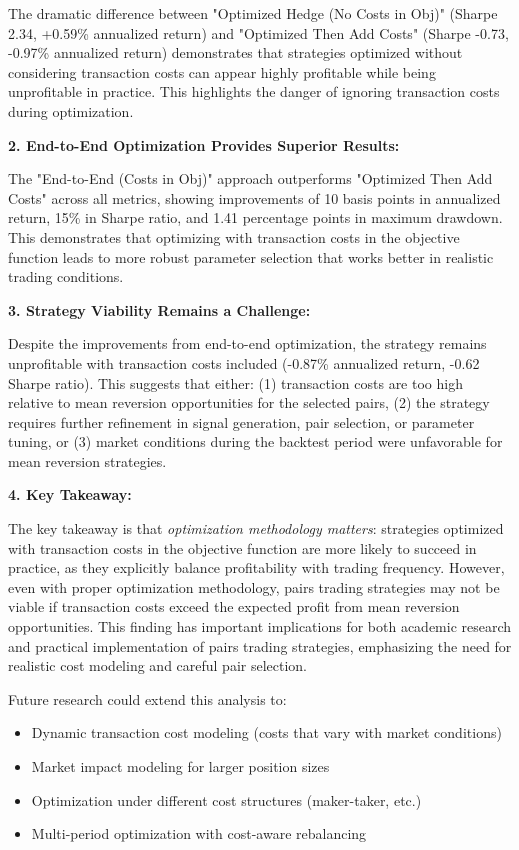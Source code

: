 The dramatic difference between "Optimized Hedge (No Costs in Obj)" (Sharpe 2.34, +0.59\% annualized return) and "Optimized Then Add Costs" (Sharpe -0.73, -0.97\% annualized return) demonstrates that strategies optimized without considering transaction costs can appear highly profitable while being unprofitable in practice. This highlights the danger of ignoring transaction costs during optimization.

\textbf{2. End-to-End Optimization Provides Superior Results:}

The "End-to-End (Costs in Obj)" approach outperforms "Optimized Then Add Costs" across all metrics, showing improvements of 10 basis points in annualized return, 15\% in Sharpe ratio, and 1.41 percentage points in maximum drawdown. This demonstrates that optimizing with transaction costs in the objective function leads to more robust parameter selection that works better in realistic trading conditions.

\textbf{3. Strategy Viability Remains a Challenge:}

Despite the improvements from end-to-end optimization, the strategy remains unprofitable with transaction costs included (-0.87\% annualized return, -0.62 Sharpe ratio). This suggests that either: (1) transaction costs are too high relative to mean reversion opportunities for the selected pairs, (2) the strategy requires further refinement in signal generation, pair selection, or parameter tuning, or (3) market conditions during the backtest period were unfavorable for mean reversion strategies.

\textbf{4. Key Takeaway:}

The key takeaway is that \textit{optimization methodology matters}: strategies optimized with transaction costs in the objective function are more likely to succeed in practice, as they explicitly balance profitability with trading frequency. However, even with proper optimization methodology, pairs trading strategies may not be viable if transaction costs exceed the expected profit from mean reversion opportunities. This finding has important implications for both academic research and practical implementation of pairs trading strategies, emphasizing the need for realistic cost modeling and careful pair selection.

Future research could extend this analysis to:
\begin{itemize}
    \item Dynamic transaction cost modeling (costs that vary with market conditions)
    \item Market impact modeling for larger position sizes
    \item Optimization under different cost structures (maker-taker, etc.)
    \item Multi-period optimization with cost-aware rebalancing
\end{itemize}

